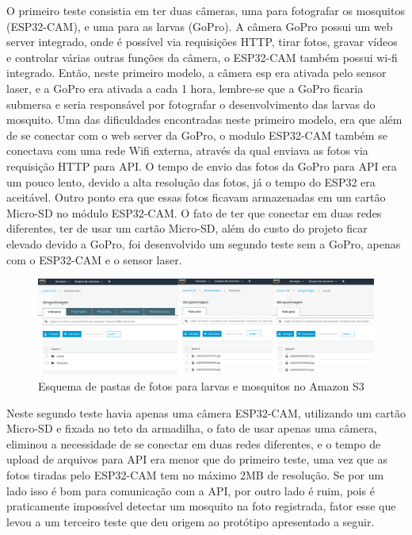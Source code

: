 \documentclass[
	12pt,				%
	openright,			%
	oneside,			%
	a4paper,			%
	chapter=TITLE,		%
	english,			%
	brazil				%
	]{abntex2}
\begin{document}
O primeiro teste consistia em ter duas câmeras, uma para fotografar 
os mosquitos (ESP32-CAM), e uma para as larvas (GoPro). A câmera GoPro possui um web server integrado, onde é possível via requisições HTTP, tirar fotos, gravar vídeos e controlar 
várias outras funções da câmera, o ESP32-CAM também possui wi-fi integrado. Então, neste primeiro modelo, a câmera esp era ativada pelo sensor laser, e a GoPro era ativada a cada 1 hora, 
lembre-se que a GoPro ficaria submersa e seria responsável por fotografar o desenvolvimento das larvas do mosquito. 
Uma das dificuldades encontradas neste primeiro modelo, era que além de se conectar com o web server da GoPro, 
o modulo ESP32-CAM também se conectava com uma rede Wifi externa, através da qual enviava as fotos via requisição HTTP para API. 
O tempo de envio das fotos da GoPro para API era um pouco lento, devido a alta resolução das fotos, já o tempo do ESP32 era aceitável. 
Outro ponto era que essas fotos ficavam armazenadas em um cartão Micro-SD no módulo ESP32-CAM. O fato de ter que conectar em duas redes diferentes, 
ter de usar um cartão Micro-SD, além do custo do projeto ficar elevado devido a GoPro, foi desenvolvido um segundo teste sem a GoPro, apenas 
com o ESP32-CAM e o sensor laser.

\begin{figure}[H]
    \centering
    \includegraphics[scale=0.2]{imagens/larvasMosquitos.png}
    \caption{Esquema de pastas de fotos para larvas e mosquitos no Amazon S3}
        \label{fig:larvasMosquitos}
    \end{figure}

Neste segundo teste havia apenas uma câmera ESP32-CAM, utilizando um cartão Micro-SD e fixada no teto da armadilha, o fato de usar apenas uma câmera, eliminou a necessidade 
de se conectar em duas redes diferentes, e o tempo de upload de arquivos para API era menor que do primeiro teste, uma vez que as fotos tiradas pelo ESP32-CAM
tem no máximo 2MB de resolução. Se por um lado isso é bom para comunicação com a API, por outro lado é ruim, pois é praticamente impossível detectar um mosquito na foto registrada, 
fator esse que levou a um terceiro teste que deu origem ao protótipo apresentado a seguir.
\end{document}
